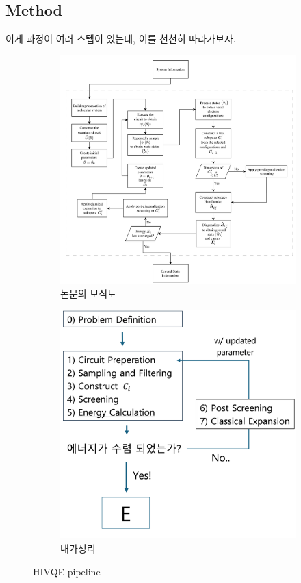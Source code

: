\documentclass[11pt]{article}
\begin{document}
\subsection{Method}
이게 과정이 여러 스텝이 있는데, 이를 천천히 따라가보자. 
\begin{figure}[htbp]
  \centering
  \begin{subfigure}[b]{0.45\textwidth}
    \includegraphics[width=\textwidth]{fig/HIVQE_paper.png}
    \caption{논문의 모식도}
    \label{fig:first}
  \end{subfigure}
  \hfill
  \vrule width 1pt  %
  \hfill
  \begin{subfigure}[b]{0.45\textwidth}
    \includegraphics[width=\textwidth]{fig/HIVQE_my.png}
    \caption{내가정리}
    \label{fig:second}
  \end{subfigure}
  \caption{HIVQE pipeline}
  \label{fig:two_figures_side_by_side}
\end{figure}
\end{document}
